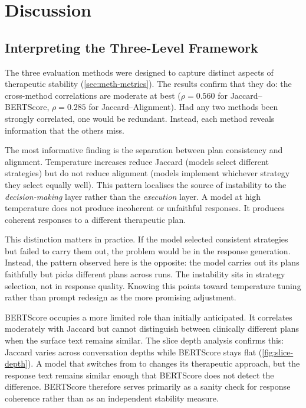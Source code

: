 \chapter{Discussion}
\label{chap:discussion}

\section{Interpreting the Three-Level Framework}
\label{sec:disc-framework-interpretation}

The three evaluation methods were designed to capture distinct aspects of
therapeutic stability (\autoref{sec:meth-metrics}). The results confirm
that they do: the cross-method correlations are moderate at best
($\rho = 0.560$ for Jaccard--BERTScore, $\rho = 0.285$ for
Jaccard--Alignment). Had any two methods been strongly correlated, one
would be redundant. Instead, each method reveals information that the
others miss.

The most informative finding is the separation between plan consistency
and alignment. Temperature increases reduce Jaccard (models select
different strategies) but do not reduce alignment (models implement
whichever strategy they select equally well). This pattern localises the
source of instability to the \emph{decision-making} layer rather than the
\emph{execution} layer. A model at high temperature does not produce
incoherent or unfaithful responses. It produces coherent responses to a
different therapeutic plan.

This distinction matters in practice. If the model selected consistent
strategies but failed to carry them out, the problem would be in the
response generation. Instead, the pattern observed here is the opposite:
the model carries out its plans faithfully but picks different plans across
runs. The instability sits in strategy selection, not in response quality.
Knowing this points toward temperature tuning rather than prompt
redesign as the more promising adjustment.

BERTScore occupies a more limited role than initially anticipated. It
correlates moderately with Jaccard but cannot distinguish between
clinically different plans when the surface text remains similar. The
slice depth analysis confirms this: Jaccard varies across conversation
depths while BERTScore stays flat (\autoref{fig:slice-depth}). A model
that switches from  to 
changes its therapeutic approach, but the response text remains similar
enough that BERTScore does not detect the difference. BERTScore therefore
serves primarily as a sanity check for response coherence rather than as
an independent stability measure.


